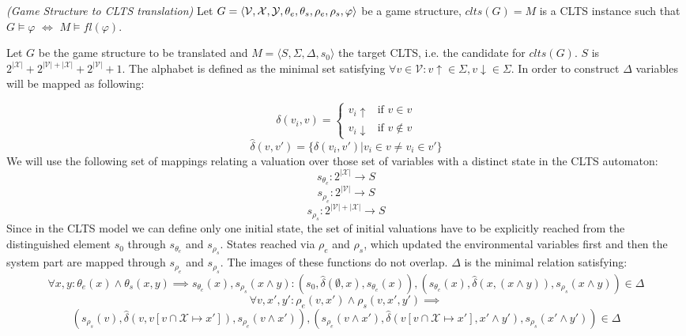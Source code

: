 \begin{definition}
	\label{def:gs_to_clts_translation} \emph{(Game Structure to CLTS translation)} 
Let $G =  \langle {\mathcal{V}}, {\mathcal{X}}, {\mathcal{Y}}, {\theta_e}, {\theta_s}, {\rho_e}, {\rho_s}, \varphi \rangle$ be a game structure, $clts(G)=M$ is a CLTS instance such that $G \models \varphi$ $\iff$ $M \models fl(\varphi)$.
\end{definition}

Let $G$ be the game structure to be translated and $M=\langle S, \Sigma, \Delta, s_0 \rangle$ the target CLTS, i.e. the candidate for $clts(G)$. 
$S$ is $2^{|\mathcal{X}|}+2^{|\mathcal{V}|+|\mathcal{X}|}+2^{|\mathcal{V}|}+1$.
The alphabet is defined as the minimal set satisfying 
$\forall v \in \mathcal{V}: v\uparrow \in \Sigma, v\downarrow \in \Sigma$. 
In order to construct $\Delta$ variables will be mapped as following:

\[
\delta(v_i,v) = \begin{cases}
v_i\uparrow & \text{if } v \in v \\
v_i\downarrow & \text{if } v \not\in v
\end{cases}
\]
\[\hat{\delta}(v,v') = \lbrace \delta(v_i,v') | v_i \in v \neq v_i \in v' \rbrace \]
We will use the following set of mappings relating a valuation over those set of variables with a distinct state in the CLTS automaton:
\[s_{\theta_e}:2^{|\mathcal{X}|}\rightarrow S\]
\[s_{\rho_e}:2^{|\mathcal{V}|} \rightarrow S\]
\[s_{\rho_s}:2^{|\mathcal{V}| + |\mathcal{X}|}\rightarrow S\]
Since in the CLTS model we can define only one initial state, the set of initial valuations have to be explicitly reached from the distinguished element $s_0$ through $s_{\theta_e}$ and $s_{\rho_s}$. States reached via $\rho_e$ and $\rho_s$, which updated the environmental variables first and then the system part are mapped through $s_{\rho_e}$ and $s_{\rho_s}$.  The images of these functions do not overlap. 
$\Delta$ is the minimal relation satisfying:
	\[
	\forall x, y: \theta_e(x) \wedge \theta_s(x,y) \implies s_{\theta_e}(x),s_{\rho_s}(x \wedge y) : (s_0, \hat{\delta} (\emptyset, x), s_{\theta_e}(x)), (s_{\theta_e}(x), \hat{\delta} (x,(x \wedge y)), s_{\rho_s}(x \wedge y)) \in \Delta 
	\] 
	\[
	\forall v, x', y': \rho_e(v,x') \wedge \rho_s(v,x',y') \implies\]
	\[(s_{\rho_s}(v), \hat{\delta} (v, v [v \cap \mathcal{X} \mapsto x']),s_{\rho_e}(v \wedge x')), (s_{\rho_e}(v \wedge x'), \hat{\delta} (v[v \cap \mathcal{X}  \mapsto x'],x' \wedge y'), s_{\rho_s}(x' \wedge y')) \in \Delta 
	\] 

